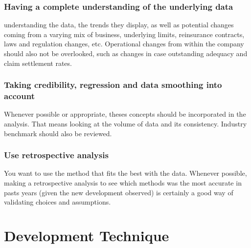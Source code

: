 \documentclass[11pt, english]{memoir}
\numberwithin{definition}{section}
\begin{document}
\subsection*{Having a complete understanding of the underlying data}
understanding the data, the trends they display, as well as potential changes coming from a varying mix of business, underlying limits, reinsurance contracts, laws and regulation changes, etc. Operational changes from within the company should also not be overlooked, such as changes in case outstanding adequacy and claim settlement rates. 

\subsection*{Taking credibility, regression and data smoothing into account}
Whenever possible or appropriate, theses concepts should be incorporated in the analysis. That means looking at the volume of data and its consistency. Industry benchmark should also be reviewed. 

\subsection*{Use retrospective analysis}
You want to use the method that fits the best with the data. Whenever possible, making a retrospective analysis to see which methods was the most accurate in pasts years (given the new development observed) is certainly a good way of validating choices and assumptions. 














\chapter{Development Technique}
\end{document}
